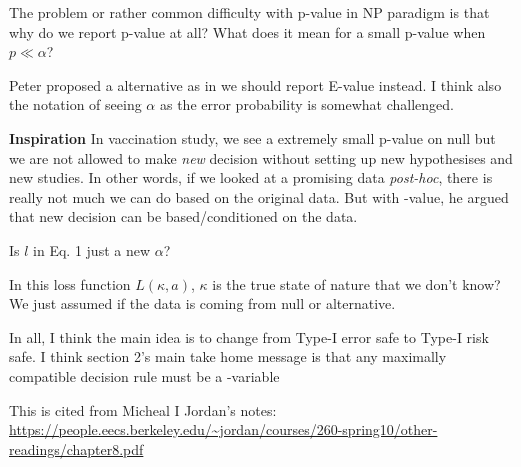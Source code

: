 The problem or rather common difficulty with p-value in NP paradigm is that
why do we report p-value at all?
What does it mean for a small p-value when $p\ll\alpha$?

Peter proposed a alternative as in we should report E-value instead.
I think also the notation of seeing $\alpha$ as the error probability is somewhat challenged.

\textbf{Inspiration} \quad In vaccination study, we see a extremely small p-value on null
but we are not allowed to make \emph{new} decision without setting up new hypothesises and
new studies. In other words, if we looked at a promising data \emph{post-hoc},
there is really not much we can do based on the original data.
But with \E-value, he argued that new decision can be based/conditioned on the data.

Is $l$ in Eq. 1 \cite{grunwaldNeymanPearsonEvalues2024} just a new $\alpha$?

In this loss function $L(\kappa, a)$, $\kappa$ is the true state of nature that we don't know?
We just assumed if the data is coming from null or alternative.

In all, I think the main idea is to change from Type-I error safe to Type-I risk safe.
I think section 2's main take home message is that any maximally compatible decision rule must
be a \E-variable

This is cited from Micheal I Jordan's notes:
\url{https://people.eecs.berkeley.edu/~jordan/courses/260-spring10/other-readings/chapter8.pdf}


\clearpage